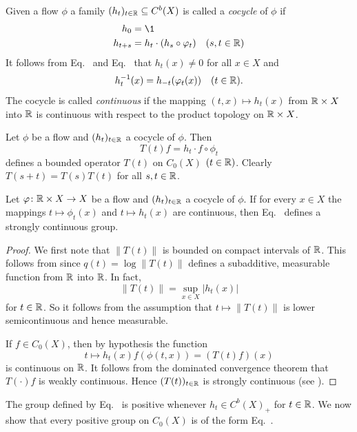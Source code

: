 Given a flow $\phi$ a family $(h_{t})_{t \in \mathbb{R}} \subseteq C^{b}(X)$ is called a \emph{cocycle} of\/ $\phi$ if
\begin{align}
h_{0} &= \1 \label{eq:b2-3.10} \\
h_{t+s} &= h_{t} \cdot (h_{s} \circ \phi_{t}) \quad (s,t \in \R) \label{eq:b2-3.11}
\end{align}
It follows from Eq.~ and Eq.~ that $h_{t}(x) \neq 0$ for all $x \in X$ and 
%
\[
	h_{t}^{-1}(x) = h_{-t}(\phi_{t}(x)) \quad (t \in \R).
\]
%
The cocycle is called \emph{continuous} if the mapping $(t,x) \mapsto h_{t}(x)$ from $\mathbb{R} \times X$ into $\mathbb{R}$ is continuous with respect to the product topology on $\mathbb{R} \times X$.

Let $\phi$ be a flow and $(h_{t})_{t \in \mathbb{R}}$ a cocycle of\/ $\phi$.
Then
\begin{equation}\label{eq:b2-3.12}
T(t)f = h_{t} \cdot f \circ \phi_{t}
\end{equation}
defines a bounded operator $T(t)$ on $C_{0}(X)$ $(t \in \mathbb{R})$.
Clearly $T(s+t) = T(s)T(t)$ for all $s,t \in \mathbb{R}$.
\begin{proposition}\label{prop:b2-3.8}
Let $\phi \colon \R \times X \to X$ be a flow and $(h_{t})_{t \in \mathbb{R}}$ a cocycle of\/ $\phi$.
If for every $x \in X$ the mappings $t \mapsto \phi_{t}(x)$ and $t \mapsto h_{t}(x)$ are continuous, then Eq.~ defines a strongly continuous group.
\end{proposition}
\begin{proof}
We first note that $\|T(t)\|$ is bounded on compact intervals of\/ $\mathbb{R}$.
This follows from \textcite[7.4.1]{hillephillips:1957} since $q(t) = \log\|T(t)\|$ defines a subadditive, measurable function from $\mathbb{R}$ into $\mathbb{R}$.
In fact, 
%
\[
	\|T(t)\| = \sup_{x \in X}|h_{t}(x)|
\]
%
for $t \in \mathbb{R}$.
So it follows from the assumption that $t \mapsto \|T(t)\|$ is lower semicontinuous and hence measurable.

If\/ $f \in C_{0}(X)$, then by hypothesis the function
%
\[
	t \mapsto h_{t}(x) f(\phi(t,x)) = (T(t) f) (x)
\]
%
is continuous on $\mathbb{R}$.
It follows from the dominated convergence theorem that $T(\cdot)f$ is weakly continuous.
Hence $(T(t))_{t \in \mathbb{R}}$ is strongly continuous (see \eg \textcite[Proposition  1.23]{davies:1980}).
\end{proof}
The group defined by Eq.~ is positive whenever %
$ h_{t} \in  C^{b}(X)_{+}$ for $ t \in \mathbb{R}$.
We now show that every positive group on $C_0(X)$ is of the form Eq.~.
